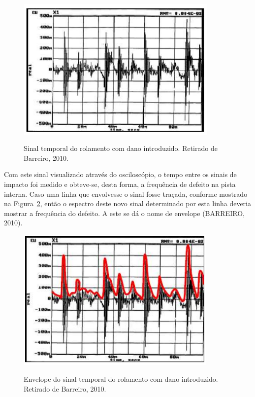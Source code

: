 \documentclass[
	12pt,				
	oneside,			
	a4paper,			
	english,			
	brazil,			
	]{abntex2ppgsi}
\begin{document}
\begin{figure}[H]
\centering
\caption {Sinal temporal do rolamento com dano introduzido. Retirado de Barreiro, 2010.}
\includegraphics[width=\textwidth,height=70mm,keepaspectratio]{sinal_temporal_rolamento_barreiro}
\label{sinal_temporal_rolamento_barreiro}
\end{figure}

Com este sinal visualizado através do osciloscópio, o tempo entre os sinais de impacto foi medido e obteve-se, desta forma, a frequência de defeito na pista interna. Caso uma linha que envolvesse o sinal fosse traçada, conforme mostrado na Figura~\ref{sinal_envelope_rolamento_barreiro}, então o espectro deste novo sinal determinado por esta linha deveria mostrar a frequência do defeito. A este se dá o nome de envelope (BARREIRO, 2010). 

\begin{figure}[H]
\centering
\caption {Envelope do sinal temporal do rolamento com dano introduzido. Retirado de Barreiro, 2010.}
\includegraphics[width=\textwidth,height=70mm,keepaspectratio]{sinal_envelope_rolamento_barreiro}
\label{sinal_envelope_rolamento_barreiro}
\end{figure}
\end{document}
